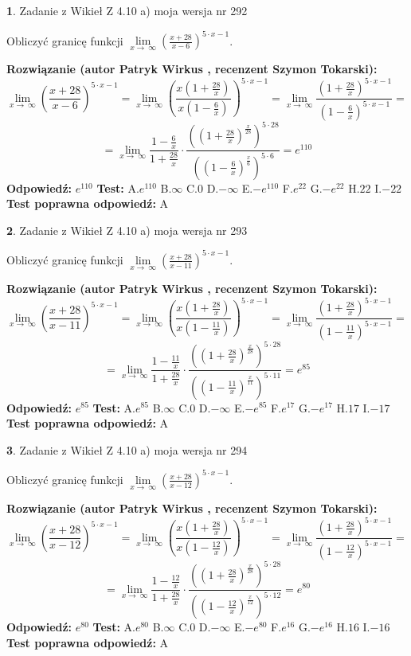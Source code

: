 \documentclass[12pt, a4paper]{article}
\theoremstyle{definition} %
\newtheorem{zad}{}
\newcommand{\zadStart}[1]{\begin{zad}#1\newline}
\newcommand{\zadStop}{\end{zad}}
\newcommand{\rozwStart}[2]{\noindent \textbf{Rozwiązanie (autor #1 , recenzent #2): }\newline}
\newcommand{\rozwStop}{\newline}
\newcommand{\odpStart}{\noindent \textbf{Odpowiedź:}\newline}
\newcommand{\odpStop}{\newline}
\newcommand{\testStart}{\noindent \textbf{Test:}\newline}
\newcommand{\testStop}{\newline}
\newcommand{\kluczStart}{\noindent \textbf{Test poprawna odpowiedź:}\newline}
\newcommand{\kluczStop}{\newline}
\begin{document}
\zadStart{Zadanie z Wikieł Z 4.10 a) moja wersja nr 292}

Obliczyć granicę funkcji  $\lim\limits_{x\to\ \infty}(\frac{x+28}{x-6})^{5\cdot x-1}$.
\zadStop
\rozwStart{Patryk Wirkus}{Szymon Tokarski}
$$\lim\limits_{x\to\ \infty}(\frac{x+28}{x-6})^{5\cdot x-1} = \lim\limits_{x\to\ \infty}(\frac{x(1+\frac{28}{x})}{x(1-\frac{6}{x})})^{5\cdot x-1}=\lim\limits_{x\to\ \infty}\frac{(1+\frac{28}{x})^{5\cdot x-1}}{(1-\frac{6}{x})^{5\cdot x-1}}=$$
$$=\lim\limits_{x\to\ \infty}\frac{1-\frac{6}{x}}{1+\frac{28}{x}}\cdot\frac{((1+\frac{28}{x})^{\frac{x}{28}})^{5\cdot28}}{((1-\frac{6}{x})^{\frac{x}{6}})^{5\cdot6}}=e^{110}$$
\rozwStop
\odpStart
$e^{110}$
\odpStop
\testStart
A.$e^{110}$ B.$\infty$ C.$0$ D.$-\infty$ E.$-e^{110}$
F.$e^{22}$ G.$-e^{22}$
H.$22$
I.$-22$
\testStop
\kluczStart
A
\kluczStop



\zadStart{Zadanie z Wikieł Z 4.10 a) moja wersja nr 293}

Obliczyć granicę funkcji  $\lim\limits_{x\to\ \infty}(\frac{x+28}{x-11})^{5\cdot x-1}$.
\zadStop
\rozwStart{Patryk Wirkus}{Szymon Tokarski}
$$\lim\limits_{x\to\ \infty}(\frac{x+28}{x-11})^{5\cdot x-1} = \lim\limits_{x\to\ \infty}(\frac{x(1+\frac{28}{x})}{x(1-\frac{11}{x})})^{5\cdot x-1}=\lim\limits_{x\to\ \infty}\frac{(1+\frac{28}{x})^{5\cdot x-1}}{(1-\frac{11}{x})^{5\cdot x-1}}=$$
$$=\lim\limits_{x\to\ \infty}\frac{1-\frac{11}{x}}{1+\frac{28}{x}}\cdot\frac{((1+\frac{28}{x})^{\frac{x}{28}})^{5\cdot28}}{((1-\frac{11}{x})^{\frac{x}{11}})^{5\cdot11}}=e^{85}$$
\rozwStop
\odpStart
$e^{85}$
\odpStop
\testStart
A.$e^{85}$ B.$\infty$ C.$0$ D.$-\infty$ E.$-e^{85}$
F.$e^{17}$ G.$-e^{17}$
H.$17$
I.$-17$
\testStop
\kluczStart
A
\kluczStop



\zadStart{Zadanie z Wikieł Z 4.10 a) moja wersja nr 294}

Obliczyć granicę funkcji  $\lim\limits_{x\to\ \infty}(\frac{x+28}{x-12})^{5\cdot x-1}$.
\zadStop
\rozwStart{Patryk Wirkus}{Szymon Tokarski}
$$\lim\limits_{x\to\ \infty}(\frac{x+28}{x-12})^{5\cdot x-1} = \lim\limits_{x\to\ \infty}(\frac{x(1+\frac{28}{x})}{x(1-\frac{12}{x})})^{5\cdot x-1}=\lim\limits_{x\to\ \infty}\frac{(1+\frac{28}{x})^{5\cdot x-1}}{(1-\frac{12}{x})^{5\cdot x-1}}=$$
$$=\lim\limits_{x\to\ \infty}\frac{1-\frac{12}{x}}{1+\frac{28}{x}}\cdot\frac{((1+\frac{28}{x})^{\frac{x}{28}})^{5\cdot28}}{((1-\frac{12}{x})^{\frac{x}{12}})^{5\cdot12}}=e^{80}$$
\rozwStop
\odpStart
$e^{80}$
\odpStop
\testStart
A.$e^{80}$ B.$\infty$ C.$0$ D.$-\infty$ E.$-e^{80}$
F.$e^{16}$ G.$-e^{16}$
H.$16$
I.$-16$
\testStop
\kluczStart
A
\kluczStop
\end{document}
